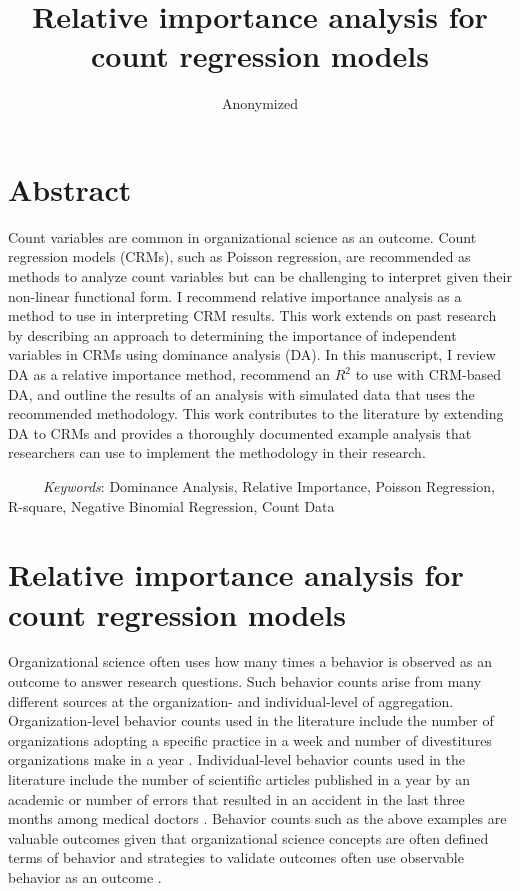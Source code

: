 \documentclass[man]{apa7}
\title{Relative importance analysis for count regression models}
\author{Anonymized}
\affiliation{Anonymized}
\begin{document}
	\section{Abstract}
	Count variables are common in organizational science as an outcome. Count regression models (CRMs), such as Poisson regression, are recommended as methods to analyze count variables but can be challenging to interpret given their non-linear functional form. I recommend relative importance analysis as a method to use in interpreting CRM results. This work extends on past research by describing an approach to determining the importance of independent variables in CRMs using dominance analysis (DA). In this manuscript, I review DA as a relative importance method, recommend an $R^2$ to use with CRM-based DA, and outline the results of an analysis with simulated data that uses the recommended methodology. This work contributes to the literature by extending DA to CRMs and provides a thoroughly documented example analysis that researchers can use to implement the methodology in their research.
	
	\ \ \ \ \ \emph{Keywords}: Dominance Analysis, Relative Importance, Poisson Regression, R-square, Negative Binomial Regression, Count Data
	
	\newpage

\section{Relative importance analysis for count regression models}
	Organizational science often uses how many times a behavior is observed as an outcome to answer research questions. 
	Such behavior counts arise from many different sources at the organization- and individual-level of aggregation.
	Organization-level behavior counts used in the literature include the number of organizations adopting a specific practice in a week \parencite{naumovska2021strength} and number of divestitures organizations make in a year \parencite{bettinazzi2021stakeholder}. 
	Individual-level behavior counts used in the literature include the number of scientific articles published in a year by an academic \parencite{rotolo2013does} or number of errors that resulted in an accident in the last three months among medical doctors \parencite{naveh2015active}.
	Behavior counts such as the above examples are valuable outcomes given that organizational science concepts are often defined terms of behavior \parencite[e.g., job performance;][]{motowidlo2003job} and strategies to validate outcomes often use observable behavior as an outcome \parencite[e.g., criterion-oriented validity;][]{cronbach1955construct}.
	
\end{document}
